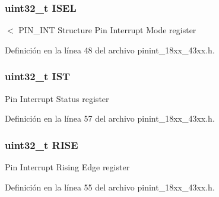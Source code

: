 \subsubsection[{\texorpdfstring{I\+S\+EL}{ISEL}}]{ uint32\+\_\+t I\+S\+EL}\hypertarget{struct_l_p_c___p_i_n___i_n_t___t_aa4712e303826c4f50c0b69ffd8a3ecff}{}\label{struct_l_p_c___p_i_n___i_n_t___t_aa4712e303826c4f50c0b69ffd8a3ecff}
$<$ P\+I\+N\+\_\+\+I\+NT Structure Pin Interrupt Mode register 

Definición en la línea 48 del archivo pinint\+\_\+18xx\+\_\+43xx.\+h.

\subsubsection[{\texorpdfstring{I\+ST}{IST}}]{ uint32\+\_\+t I\+ST}\hypertarget{struct_l_p_c___p_i_n___i_n_t___t_a4c6f04cecd7e773be42dc6b5d7f5368a}{}\label{struct_l_p_c___p_i_n___i_n_t___t_a4c6f04cecd7e773be42dc6b5d7f5368a}
Pin Interrupt Status register 

Definición en la línea 57 del archivo pinint\+\_\+18xx\+\_\+43xx.\+h.

\subsubsection[{\texorpdfstring{R\+I\+SE}{RISE}}]{ uint32\+\_\+t R\+I\+SE}\hypertarget{struct_l_p_c___p_i_n___i_n_t___t_a531a810d7097a9175434fc10bed8d900}{}\label{struct_l_p_c___p_i_n___i_n_t___t_a531a810d7097a9175434fc10bed8d900}
Pin Interrupt Rising Edge register 

Definición en la línea 55 del archivo pinint\+\_\+18xx\+\_\+43xx.\+h.

